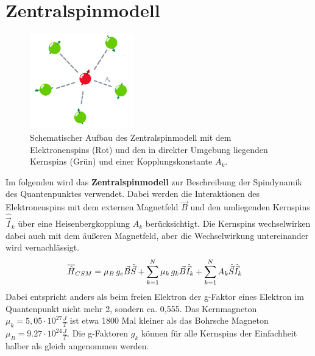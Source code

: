 \chapter{Zentralspinmodell}

\begin{figure}
    \centering
    \includegraphics[width = 0.4\textwidth]{Abbildungen/CSM_Schema_Salem.png}
    \caption{Schematischer Aufbau des Zentralspinmodell mit dem Elektronenspins (Rot) und den in direkter Umgebung liegenden 
    Kernspins (Grün) und einer Kopplungskonstante $A_k$.}
    \label{fig:CSM}
\end{figure}
Im folgenden wird das \textbf{Zentralspinmodell} zur Beschreibung der Spindynamik des Quantenpunktes verwendet. Dabei werden die Interaktionen des 
Elektronenspins mit dem externen Magnetfeld $\vec{B}$ und den umliegenden Kernspins $\hat{\vec{I}}_k$ über eine Heisenbergkopplung $A_k$ berücksichtigt.
Die Kernspins wechselwirken dabei auch mit dem äußeren Magnetfeld, aber die Wechselwirkung untereinander wird vernachlässigt.
\begin{align}
    \overline{\hat{H}}_{CSM} &= \mu_B\thinspace g_e \vec{B}\hat{\vec{S}} +  \sum_{k=1}^{N}\mu_k\thinspace g_k\vec{B}\hat{\vec{I}}_k + \sum_{k=1}^{N} A_k \hat{\vec{S}}\hat{\vec{I}}_k
\end{align}
Dabei entspricht anders als beim freien Elektron der g-Faktor eines Elektron im Quantenpunkt nicht mehr 2, sondern ca. 0,555\cite{PMID:17901328}.
Das Kernmagneton $\mu_k= 5,05 \cdot 10^{27} \frac{J}{T}$ ist etwa 1800 Mal kleiner als das Bohrsche 
Magneton $\mu_B = 9.27 \cdot 10^{24} \frac{J}{T}$\cite{Dyakonov2008-ub}. Die g-Faktoren $g_k$ können für alle Kernspins der 
Einfachheit halber als gleich angenommen werden. \\

